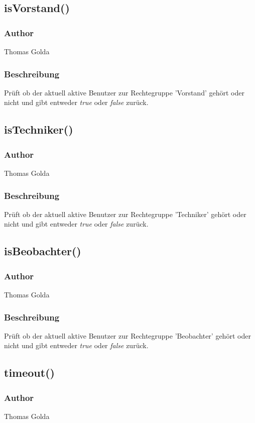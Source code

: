 \documentclass[fontsize = 12pt, paper = a4]{scrreprt}
\begin{document}
\subsection*{isVorstand()}
\subsubsection*{Author}
Thomas Golda
\subsubsection*{Beschreibung}
Prüft ob der aktuell aktive Benutzer zur Rechtegruppe 'Vorstand' gehört oder nicht und gibt entweder \textit{true} oder \textit{false} zurück.


\subsection*{isTechniker()}
\subsubsection*{Author}
Thomas Golda
\subsubsection*{Beschreibung}
Prüft ob der aktuell aktive Benutzer zur Rechtegruppe 'Techniker' gehört oder nicht und gibt entweder \textit{true} oder \textit{false} zurück.


\subsection*{isBeobachter()}
\subsubsection*{Author}
Thomas Golda
\subsubsection*{Beschreibung}
Prüft ob der aktuell aktive Benutzer zur Rechtegruppe 'Beobachter' gehört oder nicht und gibt entweder \textit{true} oder \textit{false} zurück.


\subsection*{timeout()}
\subsubsection*{Author}
Thomas Golda
\end{document}
